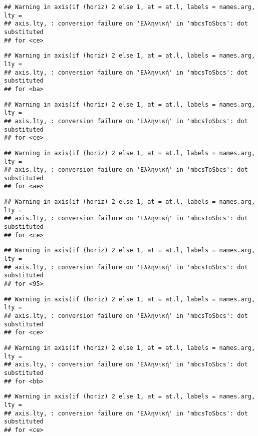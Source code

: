\documentclass[
]{article}
\begin{document}
\begin{verbatim}
## Warning in axis(if (horiz) 2 else 1, at = at.l, labels = names.arg, lty =
## axis.lty, : conversion failure on 'Ελληνική' in 'mbcsToSbcs': dot substituted
## for <ce>
\end{verbatim}

\begin{verbatim}
## Warning in axis(if (horiz) 2 else 1, at = at.l, labels = names.arg, lty =
## axis.lty, : conversion failure on 'Ελληνική' in 'mbcsToSbcs': dot substituted
## for <ba>
\end{verbatim}

\begin{verbatim}
## Warning in axis(if (horiz) 2 else 1, at = at.l, labels = names.arg, lty =
## axis.lty, : conversion failure on 'Ελληνική' in 'mbcsToSbcs': dot substituted
## for <ce>
\end{verbatim}

\begin{verbatim}
## Warning in axis(if (horiz) 2 else 1, at = at.l, labels = names.arg, lty =
## axis.lty, : conversion failure on 'Ελληνική' in 'mbcsToSbcs': dot substituted
## for <ae>
\end{verbatim}

\begin{verbatim}
## Warning in axis(if (horiz) 2 else 1, at = at.l, labels = names.arg, lty =
## axis.lty, : conversion failure on 'Ελληνική' in 'mbcsToSbcs': dot substituted
## for <ce>
\end{verbatim}

\begin{verbatim}
## Warning in axis(if (horiz) 2 else 1, at = at.l, labels = names.arg, lty =
## axis.lty, : conversion failure on 'Ελληνική' in 'mbcsToSbcs': dot substituted
## for <95>
\end{verbatim}

\begin{verbatim}
## Warning in axis(if (horiz) 2 else 1, at = at.l, labels = names.arg, lty =
## axis.lty, : conversion failure on 'Ελληνική' in 'mbcsToSbcs': dot substituted
## for <ce>
\end{verbatim}

\begin{verbatim}
## Warning in axis(if (horiz) 2 else 1, at = at.l, labels = names.arg, lty =
## axis.lty, : conversion failure on 'Ελληνική' in 'mbcsToSbcs': dot substituted
## for <bb>
\end{verbatim}

\begin{verbatim}
## Warning in axis(if (horiz) 2 else 1, at = at.l, labels = names.arg, lty =
## axis.lty, : conversion failure on 'Ελληνική' in 'mbcsToSbcs': dot substituted
## for <ce>
\end{verbatim}
\end{document}
